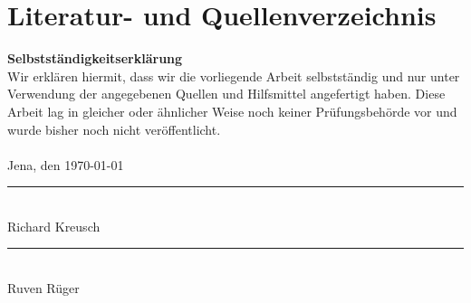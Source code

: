 


\startcontents


\setcounter{page}{\thealteSeitenzahl}





\clearpage
{}
\section*{Literatur- und Quellenverzeichnis}

\printbibliography[heading=none]
\vspace{2.5cm}
\clearpage



\clearpage
\thispagestyle{empty}
{\Large \textbf{Selbstständigkeitserklärung}}\\

Wir erklären hiermit, dass wir die vorliegende Arbeit selbstständig und nur unter 
Verwendung der angegebenen Quellen und Hilfsmittel angefertigt haben. Diese Arbeit lag 
in gleicher oder ähnlicher Weise noch keiner Prüfungsbehörde vor und wurde bisher noch 
nicht veröffentlicht.\\ \\

Jena, den \today
\vspace{1.6cm}
\par\noindent\rule{0.4\textwidth}{0.4pt}\\
\vspace{-0.8cm}
Richard Kreusch
\vspace{1.6cm}
\par\noindent\rule{0.4\textwidth}{0.4pt}\\
\vspace{-0.8cm}
Ruven Rüger

